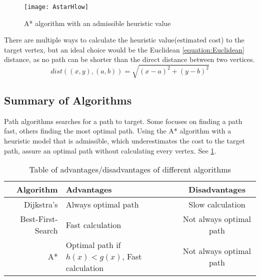   \begin{figure}[ht!]
    \centering
    \texttt{[image: AstarHlow]}
    \caption{A* algorithm with an admissible heuristic value}
    \label{astar}
  \end{figure}

  There are multiple ways to calculate the heuristic value(estimated cost) to the target vertex, but an ideal choice would be the Euclidean \cref{equation:Euclidean} distance, as no path can be shorter than the direct distance between two vertices.
  \begin{equation} \label{equation:Euclidean}
    dist((x, y), (a, b)) = \sqrt{(x - a)^2 + (y - b)^2}
  \end{equation}

  \subsection{Summary of Algorithms}

  Path algorithms searches for a path to target. Some focuses on finding a path fast, others finding the most optimal path. Using the A* algorithm with a heuristic model that is admissible, which underestimates the cost to the target path, assure an optimal path without calculating every vertex. See \cref{tbl:scheme}.
  
  \begin{table}[ht!]
    \centering
    \begin{tabular}{|r|l|c|}

      \hline
      \textbf{Algorithm} & \textbf{Advantages} & \textbf{Disadvantages} \\
      \hline
      Dijkstra's & Always optimal path & Slow calculation \\
      Best-First-Search & Fast calculation & Not always optimal path \\
      A* & Optimal path if $h(x)<g(x)$, Fast calculation & Not always optimal path \\
      \hline
    \end{tabular}
    \caption{Table of advantages/disadvantages of different algorithms}
    \label{tbl:scheme}
  \end{table}